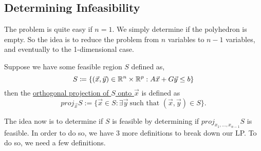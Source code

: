 \documentclass[11pt]{article}
\newcommand{\vectorproj}[2][]{\textit{proj}_{#1}#2}
\begin{document}
\subsection{Determining Infeasibility}
The problem is quite easy if $n=1$. We simply determine if the polyhedron is
empty. So the idea is to reduce the problem from $n$ variables to $n-1$
variables, and eventually to the 1-dimensional case.
\begin{definition}
Suppose we have some feasible region $S$ defined as,
\begin{equation*}
S \coloneqq \{(\vec x, \vec y) \in \mathbb{R}^n \times \mathbb{R}^p: A\vec x + G\vec y \leq b\}
\end{equation*}
then the \underline{orthogonal projection of $S$ onto $\vec x$} is defined as
\begin{equation*}
\vectorproj[\vec x]{S} := \{\vec x \in S: \exists \vec y\> \text{such that }
(\vec x, \vec y) \in S\}.
\end{equation*}
\end{definition}
The idea now is to determine if $S$ is feasible by determining if
$\vectorproj[x_1,\dots,x_{n-1}]{S}$ is feasible. In order to do so, we have 3
more definitions to break down our LP\@. To do so, we need a few definitions.\\
\end{document}
